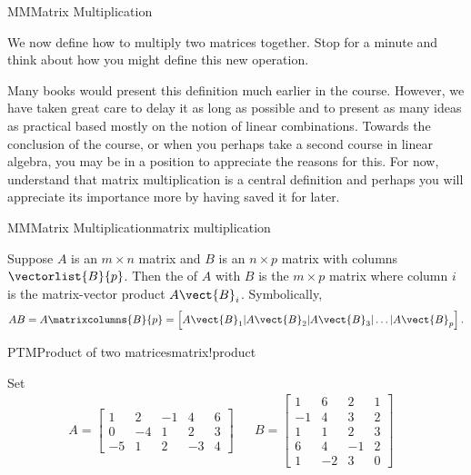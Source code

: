 \begin{subsect}{MM}{Matrix Multiplication}
%
\begin{para}We now define how to multiply two matrices together.  Stop for a minute and think about how you might define this new operation.\end{para}
%
\begin{para}Many books would present this definition much earlier in the course.  However, we have taken great care to delay it as long as possible and to present as many ideas as practical based mostly on the notion of linear combinations.  Towards the conclusion of the course, or when you perhaps take a second course in linear algebra, you may be in a position to appreciate the reasons for this.  For now, understand that matrix multiplication is a central definition and perhaps you will appreciate its importance more by having saved it for later.\end{para}
%
\begin{definition}{MM}{Matrix Multiplication}{matrix multiplication}
\begin{para}Suppose $A$ is an $m\times n$ matrix and $B$ is an $n\times p$ matrix with columns $\vectorlist{B}{p}$.  Then the  of $A$ with $B$ is the $m\times p$ matrix where column $i$ is the matrix-vector product $A\vect{B}_i$.  Symbolically,
%
\begin{equation*}
AB=A\matrixcolumns{B}{p}=\left[A\vect{B}_1|A\vect{B}_2|A\vect{B}_3|\ldots|A\vect{B}_p\right].
\end{equation*}
\end{para}
%
\end{definition}
%
\begin{example}{PTM}{Product of two matrices}{matrix!product}
\begin{para}Set
%
\begin{align*}
A=
\begin{bmatrix}
1 & 2 & -1 & 4 & 6\\
0 & -4 & 1 & 2 & 3\\
-5 & 1 & 2 & -3 & 4
\end{bmatrix}
&&
B=
\begin{bmatrix}
1 & 6 & 2 & 1\\
-1 & 4 & 3 & 2\\
1 & 1 & 2 & 3\\
6 & 4 & -1 & 2\\
1 & -2 & 3 & 0
\end{bmatrix} &

\end{align*}
\end{para}
\end{example}
\end{subsect}
